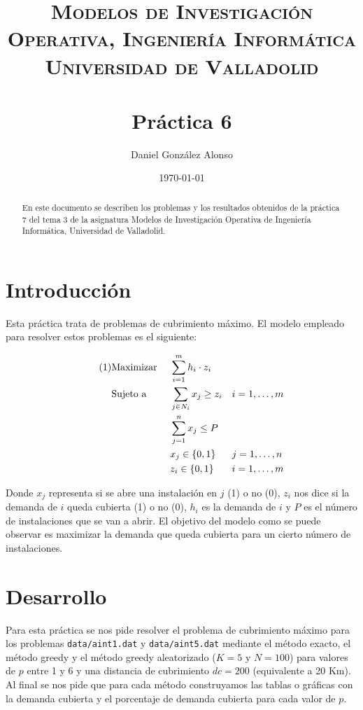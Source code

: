 \documentclass[a4paper,11pt]{article}
\title{
	\vspace{-25pt}
	\normalfont \Large \textsc{
		Modelos de Investigación Operativa,
        Ingeniería Informática\\
        Universidad de Valladolid
	}\\[10pt]
	\horrule{1pt}\\[10pt]
	\huge \textbf{
		Práctica 6
	}\\
	\horrule{1pt}
}
\author{
	\normalfont \Large Daniel González Alonso
}
\date{
	\normalfont \large \today
}
\newcommand\numberthis{							%
	\addtocounter{equation}{1}\tag{\theequation}
}
\begin{document}
\maketitle

\begin{abstract}
	En este documento se describen los problemas y los resultados obtenidos de la práctica 7 del tema 3 de la asignatura Modelos de Investigación Operativa de Ingeniería Informática, Universidad de Valladolid.
\end{abstract}

\section{Introducción}
Esta práctica trata de problemas de cubrimiento máximo. El modelo empleado para resolver estos problemas es el siguiente:

\begin{align*}\numberthis
   	&\textrm{Maximizar }	&& \sum_{i=1}^{m}{h_i \cdot z_i}		&&				\\
   	&\textrm{Sujeto a }		&& \sum_{j \in N_{i}}{x_j} \geq z_i 	&& i=1,\ldots,m \\
    &						&& \sum_{j=1}^{n}{x_j} \leq P			&&				\\
	&						&& x_{j} \in \{0,1\}					&& j=1,\ldots,n \\
	&						&& z_{i} \in \{0,1\}					&& i=1,\ldots,m \\
\end{align*}

Donde ${x_j}$ representa si se abre una instalación en ${j}$ (1) o no (0), ${z_i}$ nos dice si la demanda de ${i}$ queda cubierta (1) o no (0), ${h_i}$ es la demanda de ${i}$ y ${P}$ es el número de instalaciones que se van a abrir. El objetivo del modelo como se puede observar es maximizar la demanda que queda cubierta para un cierto número de instalaciones.

\newpage
\section{Desarrollo}

Para esta práctica se nos pide resolver el problema de cubrimiento máximo para los problemas \texttt{data/aint1.dat} y \texttt{data/aint5.dat} mediante el método exacto, el método greedy y el método greedy aleatorizado (${K=5}$ y ${N=100}$) para valores de ${p}$ entre 1 y 6 y una distancia de cubrimiento ${dc=200}$ (equivalente a 20 Km). Al final se nos pide que para cada método construyamos las tablas o gráficas con la demanda cubierta y el porcentaje de demanda cubierta para cada valor de ${p}$.\\
\end{document}
